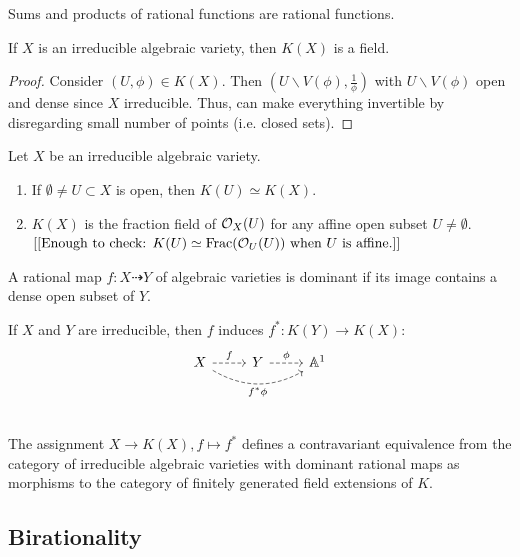 \documentclass[a4paper,11pt]{article}
\begin{document}
			Sums and products of rational functions are rational functions.

			\begin{prop}
				If $X$ is an irreducible algebraic variety, then $K(X)$ is a field.
			\end{prop}
			\begin{proof}
				Consider $(U,\phi)\in K(X)$. Then $(U\backslash V(\phi),\frac{1}{\phi})$ with $U\backslash V(\phi)$ open and dense since $X$ irreducible. Thus, can make everything invertible by disregarding small number of points (i.e. closed sets).
			\end{proof}

			\begin{remark}
				Let $X$ be an irreducible algebraic variety.
				\begin{enumerate}
					\item If $\emptyset\neq U\subset X$ is open, then $K(U)\simeq K(X)$.
					\item $K(X)$ is the fraction field of $\mathcal{O}_X(U)$ for any affine open subset $U\neq\emptyset$.\\$[[\text{Enough to check: $K(U)\simeq\operatorname{Frac}(\mathcal{O}_U(U))$ when $U$ is affine.}]]$
				\end{enumerate}
			\end{remark}

			\begin{defi}
				A rational map $f:X\dashrightarrow Y$ of algebraic varieties is dominant if its image contains a dense open subset of $Y$.
			\end{defi}

			If $X$ and $Y$ are irreducible, then $f$ induces $f^\ast:K(Y)\rightarrow K(X)$: 
			\begin{equation*}
				\begin{tikzcd}
					X\ar[r,dashed,"f"]\ar[rr,dashed,"f^\ast\phi"',bend right] & Y\ar[r,dashed,"\phi"] & \AA^1
				\end{tikzcd}
			\end{equation*}

			\begin{thm}
				\phantom{x}\\The assignment $X\rightarrow K(X), f\mapsto f^\ast$ defines a contravariant equivalence from the category of irreducible algebraic varieties with dominant rational maps as morphisms to the category of finitely generated field extensions of $K$.
			\end{thm}

		\subsection{Birationality}
			
\end{document}
